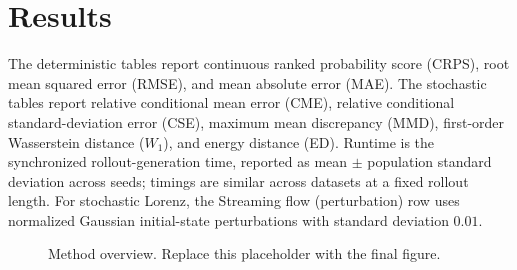 \section{Results}

  
The deterministic tables report continuous ranked
probability score (CRPS), root mean squared error (RMSE), and mean absolute
error (MAE).  The stochastic tables report relative conditional mean error
(CME), relative conditional standard-deviation error (CSE), maximum mean
discrepancy (MMD), first-order Wasserstein distance ($W_1$), and energy
distance (ED).  Runtime is the synchronized rollout-generation time, reported
as mean $\pm$ population standard deviation across seeds; timings are similar
across datasets at a fixed rollout length.  For stochastic Lorenz, the
Streaming flow (perturbation) row uses normalized Gaussian initial-state
perturbations with standard deviation $0.01$.

\setcounter{table}{6}

\clearpage
\begin{figure}[t]
\centering
{}
\caption{Method overview. Replace this placeholder with the final figure.}
\label{fig:method-overview-placeholder}
\end{figure}


